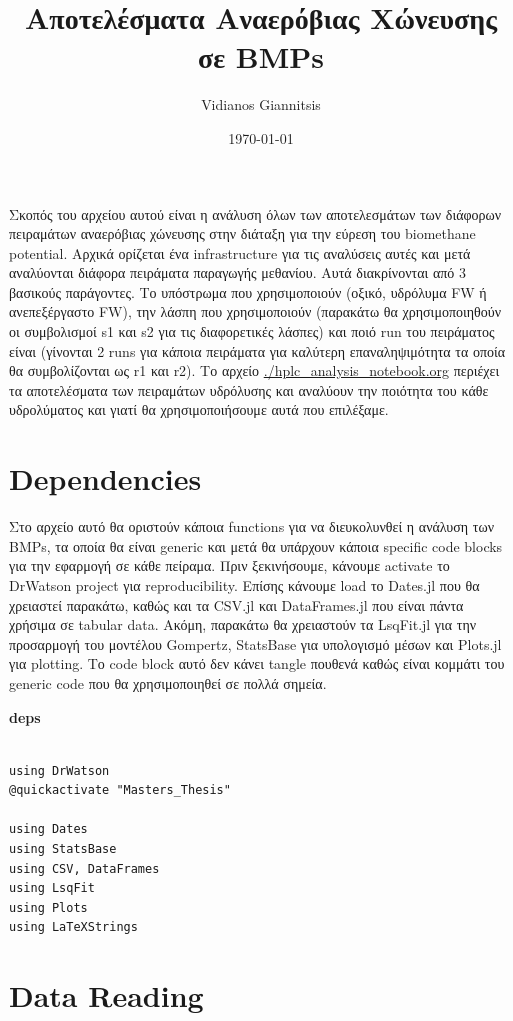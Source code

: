 \documentclass[11pt]{article}
\author{Vidianos Giannitsis}
\date{\today}
\title{Αποτελέσματα Αναερόβιας Χώνευσης σε BMPs}
\begin{document}
\maketitle
\tableofcontents

Σκοπός του αρχείου αυτού είναι η ανάλυση όλων των αποτελεσμάτων των διάφορων πειραμάτων αναερόβιας χώνευσης στην διάταξη για την εύρεση του biomethane potential. Αρχικά ορίζεται ένα infrastructure για τις αναλύσεις αυτές και μετά αναλύονται διάφορα πειράματα παραγωγής μεθανίου. Αυτά διακρίνονται από 3 βασικούς παράγοντες. Το υπόστρωμα που χρησιμοποιούν (οξικό, υδρόλυμα FW ή ανεπεξέργαστο FW), την λάσπη που χρησιμοποιούν (παρακάτω θα χρησιμοποιηθούν οι συμβολισμοί s1 και s2 για τις διαφορετικές λάσπες) και ποιό run του πειράματος είναι (γίνονται 2 runs για κάποια πειράματα για καλύτερη επαναληψιμότητα τα οποία θα συμβολίζονται ως r1 και r2). Το αρχείο \url{./hplc\_analysis\_notebook.org} περιέχει τα αποτελέσματα των πειραμάτων υδρόλυσης και αναλύουν την ποιότητα του κάθε υδρολύματος και γιατί θα χρησιμοποιήσουμε αυτά που επιλέξαμε.

\section{Dependencies}
\label{sec:org547fb26}
Στο αρχείο αυτό θα οριστούν κάποια functions για να διευκολυνθεί η ανάλυση των BMPs, τα οποία θα είναι generic και μετά θα υπάρχουν κάποια specific code blocks για την εφαρμογή σε κάθε πείραμα. Πριν ξεκινήσουμε, κάνουμε activate το DrWatson project για reproducibility. Επίσης κάνουμε load το Dates.jl που θα χρειαστεί παρακάτω, καθώς και τα CSV.jl και DataFrames.jl που είναι πάντα χρήσιμα σε tabular data. Ακόμη, παρακάτω θα χρειαστούν τα LsqFit.jl για την προσαρμογή του μοντέλου Gompertz, StatsBase για υπολογισμό μέσων και Plots.jl για plotting. Το code block αυτό δεν κάνει tangle πουθενά καθώς είναι κομμάτι του generic code που θα χρησιμοποιηθεί σε πολλά σημεία. 

\textbf{deps}
\begin{verbatim}

using DrWatson
@quickactivate "Masters_Thesis"

using Dates
using StatsBase
using CSV, DataFrames
using LsqFit
using Plots
using LaTeXStrings

\end{verbatim}

\section{Data Reading}
\label{sec:orga792998}
\end{document}
